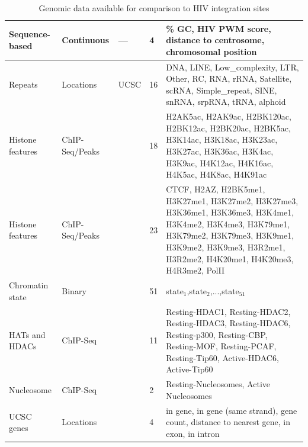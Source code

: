 \documentclass[../sherrill-Mix_thesis.tex]{subfiles}
\begin{document}
\begin{table}
{\begin{tabular}{|p{1.2in}|l|p{0.79in}|l|P{2.3in}|}
			\hline
			Sequence-based    & Continuous     & ---                           & 4               & \% GC, HIV PWM score, distance to centrosome, chromosomal position                                                                                                                                               \\ 
			\hline
			Repeats           & Locations      & UCSC \citep{Meyer2013}        & 16              & DNA, LINE, Low\_complexity, LTR, Other, RC, RNA, rRNA, Satellite, scRNA, Simple\_repeat, SINE, snRNA, srpRNA, tRNA, alphoid                                                                                      \\ 
			\hline
			Histone features  & ChIP-Seq/Peaks & \citet{Wang2008a}             & 18              & H2AK5ac, H2AK9ac, H2BK120ac, H2BK12ac, H2BK20ac, H2BK5ac, H3K14ac, H3K18ac, H3K23ac, H3K27ac, H3K36ac, H3K4ac, H3K9ac, H4K12ac, H4K16ac, H4K5ac, H4K8ac, H4K91ac                                                 \\ 
			\hline
			Histone features  & ChIP-Seq/Peaks & \citet{Barski2007}            & 23              & CTCF, H2AZ, H2BK5me1, H3K27me1, H3K27me2, H3K27me3, H3K36me1, H3K36me3, H3K4me1, H3K4me2, H3K4me3, H3K79me1, H3K79me2, H3K79me3, H3K9me1, H3K9me2, H3K9me3, H3R2me1, H3R2me2, H4K20me1, H4K20me3, H4R3me2, PolII \\ 
			\hline
			Chromatin state   & Binary         & \citet{Ernst2010}             & 51              & state$_1$,state$_2$,...,state$_{51}$                                                                                                                                                                             \\ 
			\hline
			HATs and HDACs    & ChIP-Seq       & \citet{Wang2009a}             & 11              & Resting-HDAC1, Resting-HDAC2, Resting-HDAC3, Resting-HDAC6, Resting-p300, Resting-CBP, Resting-MOF, Resting-PCAF, Resting-Tip60, Active-HDAC6, Active-Tip60                                                      \\ 
			\hline
			Nucleosome        & ChIP-Seq       & \citet{Schones2008}           & 2               & Resting-Nucleosomes, Active Nucleosomes                                                                                                                                                                          \\ 
			\hline
			UCSC genes        & Locations      & \citet{Hsu2006}               & 4               & in gene, in gene (same strand), gene count, distance to nearest gene, in exon, in intron                                                                                                                         \\ 
			\hline
		\end{tabular}
		}
		\caption[Genomic data available for comaprison to integration sites]{Genomic data available for comparison to HIV integration sites}
		\label{variables} \end{table} %
\end{document}
